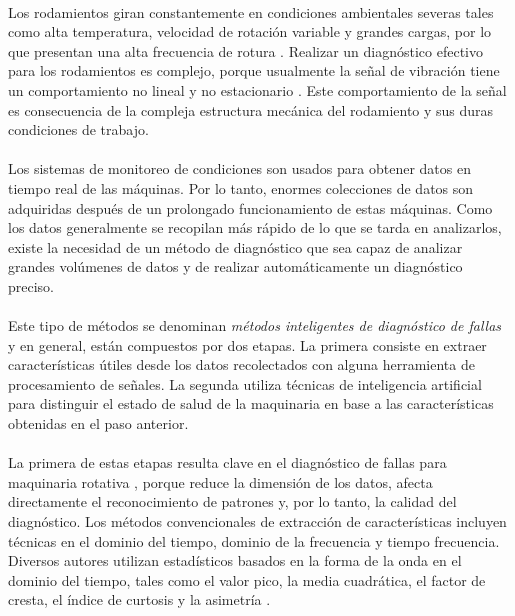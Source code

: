 \documentclass[12pt]{article}%
\begin{document}
\paragraph{}
Los rodamientos giran constantemente en condiciones ambientales severas tales como alta temperatura, velocidad de rotación variable y grandes cargas, por lo que presentan una alta frecuencia de rotura \cite{fu}. Realizar un diagnóstico efectivo para los rodamientos es complejo, porque usualmente la señal de vibración tiene un comportamiento no lineal y no estacionario \cite{li}. Este comportamiento de la señal es consecuencia de la compleja estructura mecánica del rodamiento y sus duras condiciones de trabajo.

\paragraph{}
Los sistemas de monitoreo de condiciones son usados para obtener datos en tiempo real de las máquinas. Por lo tanto, enormes colecciones de datos son adquiridas después de un prolongado funcionamiento de estas máquinas. Como los datos generalmente se recopilan más rápido de lo que se tarda en analizarlos, existe la necesidad de un método de diagnóstico que sea capaz de analizar grandes volúmenes de datos y de realizar automáticamente un diagnóstico preciso.

\paragraph{}
Este tipo de métodos se denominan \textit{métodos inteligentes de diagnóstico de fallas} y en general, están compuestos por dos etapas. La primera consiste en extraer características útiles desde los datos recolectados con alguna herramienta de procesamiento de señales. La segunda utiliza técnicas de inteligencia artificial para distinguir el estado de salud de la maquinaria en base a las características obtenidas en el paso anterior.

\paragraph{}
La primera de estas etapas resulta clave en el diagnóstico de fallas para maquinaria rotativa \cite{guo}, porque reduce la dimensión de los datos, afecta directamente el reconocimiento de patrones y, por lo tanto, la calidad del diagnóstico. Los métodos convencionales de extracción de características incluyen técnicas en el dominio del tiempo, dominio de la frecuencia y tiempo frecuencia. Diversos autores utilizan estadísticos basados en la forma de la onda en el dominio del tiempo, tales como el valor pico, la media cuadrática, el factor de cresta, el índice de curtosis y la asimetría \cite{zhu}.
 
\end{document}
